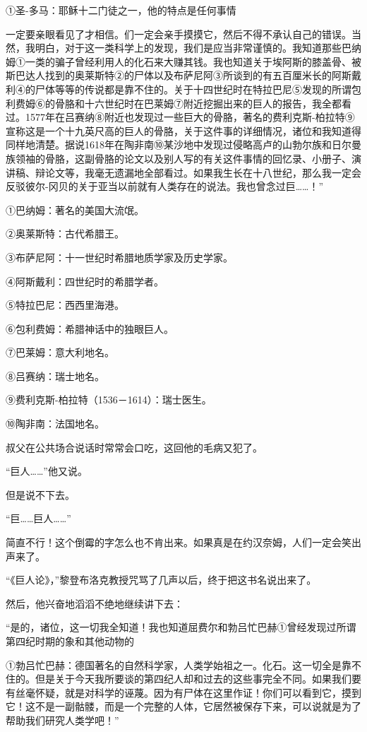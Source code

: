 \documentclass[10pt]{book}
\begin{document}
①圣-多马：耶稣十二门徒之一，他的特点是任何事情

一定要亲眼看见了才相信。们一定会亲手摸摸它，然后不得不承认自己的错误。当然，我明白，对于这一类科学上的发现，我们是应当非常谨慎的。我知道那些巴纳姆①一类的骗子曾经利用人的化石来大赚其钱。我也知道关于埃阿斯的膝盖骨、被斯巴达人找到的奥莱斯特②的尸体以及布萨尼阿③所谈到的有五百厘米长的阿斯戴利④的尸体等等的传说都是靠不住的。关于十四世纪时在特拉巴尼⑤发现的所谓包利费姆⑥的骨胳和十六世纪时在巴莱姆⑦附近挖掘出来的巨人的报告，我全都看过。1577年在吕赛纳⑧附近也发现过一些巨大的骨胳，著名的费利克斯-柏拉特⑨宣称这是一个十九英尺高的巨人的骨胳，关于这件事的详细情况，诸位和我知道得同样地清楚。据说1618年在陶非南⑩某沙地中发现过侵略高卢的山勃尔族和日尔曼族领袖的骨胳，这副骨胳的论文以及别人写的有关这件事情的回忆录、小册子、演讲稿、辩论文等，我毫无遗漏地全部看过。如果我生长在十八世纪，那么我一定会反驳彼尔-冈贝的关于亚当以前就有人类存在的说法。我也曾念过巨……！”

①巴纳姆：著名的美国大流氓。

②奥莱斯特：古代希腊王。

③布萨尼阿：十一世纪时希腊地质学家及历史学家。

④阿斯戴利：四世纪时的希腊学者。

⑤特拉巴尼：西西里海港。

⑥包利费姆：希腊神话中的独眼巨人。

⑦巴莱姆：意大利地名。

⑧吕赛纳：瑞士地名。

⑨费利克斯-柏拉特（1536－1614）：瑞士医生。

⑩陶非南：法国地名。

叔父在公共场合说话时常常会口吃，这回他的毛病又犯了。

“巨人……”他又说。

但是说不下去。

“巨……巨人……”

简直不行！这个倒霉的字怎么也不肯出来。如果真是在约汉奈姆，人们一定会笑出声来了。

“《巨人论》，”黎登布洛克教授咒骂了几声以后，终于把这书名说出来了。

然后，他兴奋地滔滔不绝地继续讲下去：

“是的，诸位，这一切我全知道！我也知道屈费尔和勃吕忙巴赫①曾经发现过所谓第四纪时期的象和其他动物的

①勃吕忙巴赫：德国著名的自然科学家，人类学始祖之一。化石。这一切全是靠不住的。但是关于今天我所要谈的第四纪人却和过去的这些事完全不同。如果我们要有丝毫怀疑，就是对科学的诬蔑。因为有尸体在这里作证！你们可以看到它，摸到它！这不是一副骷髅，而是一个完整的人体，它居然被保存下来，可以说就是为了帮助我们研究人类学吧！”
\end{document}
